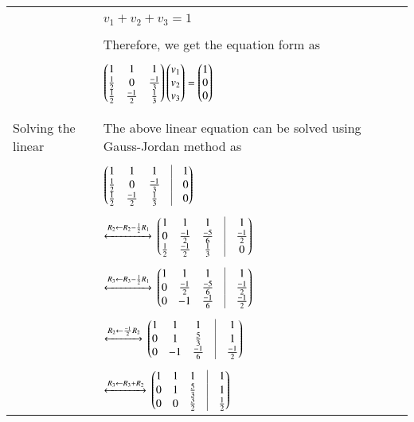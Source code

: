 \documentclass[journal,12pt]{IEEEtran}
\begin{document}
\begin{longtable}{|l|l|}
		& \\
		& \qquad \qquad \qquad $v_{1}+v_{2}+v_{3} = 1$ \\
		& \\
		& Therefore, we get the equation form as \\
		& \\
		& \qquad \qquad \qquad $\begin{pmatrix}1&1&1\\\frac{1}{2}&0&\frac{-1}{3}\\\frac{1}{2}&\frac{-1}{2}&\frac{1}{3}\end{pmatrix}\begin{pmatrix}v_{1}\\v_{2}\\v_{3}\end{pmatrix} = \begin{pmatrix}1\\0\\0\end{pmatrix}$ \\
		& \\
		\hline
		\multirow{3}{*}{Solving the linear} & \\
		& The above linear equation can be solved using Gauss-Jordan method as\\equtions
		& \\
		& \qquad \qquad \qquad $\myvec{1&1&1&\vrule&1\\\frac{1}{2}&0&\frac{-1}{3}&\vrule&0\\\frac{1}{2}&\frac{-1}{2}&\frac{1}{3}&\vrule&0}$\\
		& \\
		& \qquad $\xleftrightarrow[]{R_2 \leftarrow R_2 - \frac{1}{2}R_1}$
		$\myvec{1&1&1&\vrule&1\\0&\frac{-1}{2}&\frac{-5}{6}&\vrule&\frac{-1}{2}\\\frac{1}{2}&\frac{-1}{2}&\frac{1}{3}&\vrule&0}$\\
		&\\
		& \qquad $\xleftrightarrow[]{R_3 \leftarrow R_3 - \frac{1}{2}R_1}$
		$\myvec{1&1&1&\vrule&1\\0&\frac{-1}{2}&\frac{-5}{6}&\vrule&\frac{-1}{2}\\0&-1&\frac{-1}{6}&\vrule&\frac{-1}{2}}$\\
		&\\
		& \qquad $\xleftrightarrow[]{R_2 \leftarrow \frac{-1}{2}R_2}$
		$\myvec{1&1&1&\vrule&1\\0&1&\frac{5}{3}&\vrule&1\\0&-1&\frac{-1}{6}&\vrule&\frac{-1}{2}}$\\
		&\\
		& \qquad $\xleftrightarrow[]{R_3 \leftarrow R_3 + R_2}$
		$\myvec{1&1&1&\vrule&1\\0&1&\frac{5}{3}&\vrule&1\\0&0&\frac{3}{2}&\vrule&\frac{1}{2}}$\\

\end{longtable}
\end{document}
